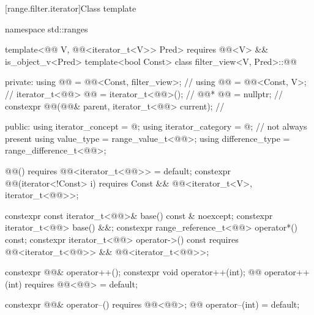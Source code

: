 [range.filter.iterator]{Class template }

%
%
\begin{codeblock}
namespace std::ranges {
  template<@@ V, @@<iterator_t<V>> Pred>
    requires @@<V> && is_object_v<Pred>
  template<bool Const>
  class filter_view<V, Pred>::@@ {
  private:
    using @@ = @@<Const, filter_view>;                     // \expos
    using @@ = @@<Const, V>;                                 // \expos
    iterator_t<@@> @@ = iterator_t<@@>();                     // \expos
    @@* @@ = nullptr;                                          // \expos
    constexpr @@(@@& parent, iterator_t<@@> current);       // \expos

  public:
    using iterator_concept  = @\seebelownc@;
    using iterator_category = @\seebelownc@;                                // not always present
    using value_type        = range_value_t<@@>;
    using difference_type   = range_difference_t<@@>;

    @@() requires @@<iterator_t<@@>> = default;
    constexpr @@(iterator<!Const> i)
      requires Const && @@<iterator_t<V>, iterator_t<@@>>;

    constexpr const iterator_t<@@>& base() const & noexcept;
    constexpr iterator_t<@@> base() &&;
    constexpr range_reference_t<@@> operator*() const;
    constexpr iterator_t<@@> operator->() const
      requires @@<iterator_t<@@>> && @@<iterator_t<@@>>;

    constexpr @@& operator++();
    constexpr void operator++(int);
    @@ operator++(int) requires @@<@@> = default;

    constexpr @@& operator--() requires @@<@@>;
    @@ operator--(int) = default;

}}
\end{codeblock}
